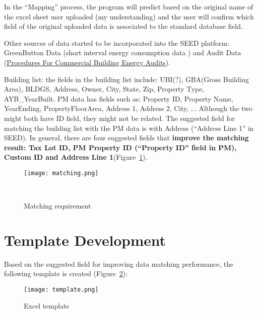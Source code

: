 \documentclass[12pt]{article}
\newcommand{\fref}[1]{Figure~\ref{#1}}
\begin{document}
  In the ``Mapping'' process, the program will predict based on the
  original name of the excel sheet user uploaded (my understanding)
  and the user will confirm which field of the original uploaded data
  is associated to the standard database field.
  
  Other sources of data started to be incorporated into the SEED
  platform: GreenButton Data (short interval energy consumption data )
  and Audit Data
  (\href{https://www.ashrae.org/resources--publications/bookstore/procedures-for-commercial-building-energy-audits}{Procedures
    For Commercial Building Energy Audits}).

  Building list: the fields in the building list include: UBI(?),
  GBA(Gross Building Area), BLDGS, Address, Owner, City, State, Zip,
  Property Type, AYB\_YearBuilt. PM data has fields such as: Property
  ID, Property Name, YearEnding, PropertyFloorArea, Address 1, Address
  2, City, ... Although the two might both have ID field, they might
  not be related. The suggested field for matching the building list
  with the PM data is with Address (``Address Line 1'' in SEED). In
  general, there are four suggested fields that \textbf{improve the
    matching result: Tax Lot ID, PM Property ID (``Property ID'' field
    in PM), Custom ID and Address Line 1}(\fref{fig:matching}).
  
  \begin{figure}[h!]
    \centering
    \texttt{[image: matching.png]}
    \caption{Matching requirement}~\cite{SEEDTutorial2015}
    \label{fig:matching}
  \end{figure}
\section{Template Development}
Based on the suggested field for improving data matching performance,
the following template is created (\fref{fig:template}):

\begin{figure}[h!]
  \centering
  \texttt{[image: template.png]}
  \caption{Excel template}
  \label{fig:template}
\end{figure}

\pagebreak
\end{document}
